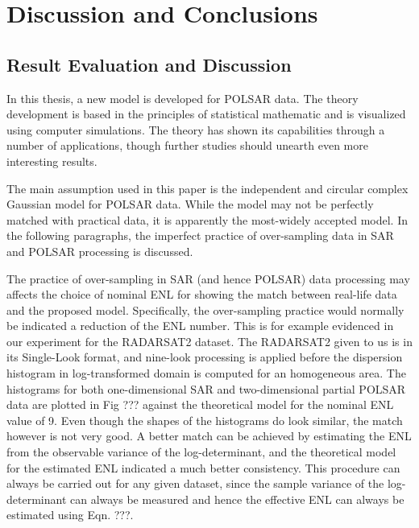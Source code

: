 \chapter{Discussion and Conclusions} %
\label{chap:conclusions}


\section{Result Evaluation and Discussion}

In this thesis, a new model is developed for POLSAR data.
The theory development is based in the principles of statistical mathematic and is visualized using computer simulations.
The theory has shown its capabilities through a number of applications, though further studies should unearth even more interesting results.

The main assumption used in this paper is the independent and circular complex Gaussian model for POLSAR data.
While the model may not be perfectly matched with practical data,
  it is apparently the most-widely accepted model.
In the following paragraphs, the imperfect practice of over-sampling   data in SAR and POLSAR processing is discussed.

The practice of over-sampling in SAR (and hence POLSAR) data processing may affects the choice of nominal ENL for showing the match between real-life data and the proposed model.
Specifically, the over-sampling practice would normally be indicated a reduction of the ENL number.
This is for example evidenced in our experiment for the RADARSAT2 dataset.
The RADARSAT2 given to us is in its Single-Look format,
  and nine-look processing is applied before the dispersion histogram in log-transformed domain is computed for an homogeneous area.
The histograms for both one-dimensional SAR and two-dimensional partial POLSAR data are plotted in Fig ???
  against the theoretical model for the nominal ENL value of 9.
Even though the shapes of the histograms do look similar, the match however is not very good.
A better match can be achieved by estimating the ENL from the observable variance of the log-determinant,
  and the theoretical model for the estimated ENL indicated a much better consistency.
This procedure can always be carried out for any given dataset,
  since the sample variance of the log-determinant can always be measured
  and hence the effective ENL can always be estimated using Eqn. ???.

